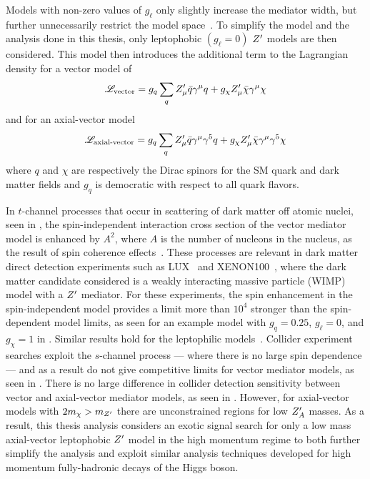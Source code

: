 Models with non-zero values of $g_{\ell}$ only slightly increase the mediator width, but further unnecessarily restrict the model space~\cite{Abercrombie:2015wmb}.
To simplify the model and the analysis done in this thesis, only leptophobic $\left(g_{\ell}=0\right)$ $Z^{\prime}$ models are then considered.
This model then introduces the additional term to the Lagrangian density for a vector model of
\[
 \mathscr{L}_{\textrm{vector}} = g_{q} \sum_{q} Z^{\prime}_{\mu} \bar{q} \gamma^{\mu} q + g_{\chi} Z^{\prime}_{\mu} \bar{\chi} \gamma^{\mu} \chi
\]
and for an axial-vector model
\[
 \mathscr{L}_{\textrm{axial-vector}} = g_{q} \sum_{q} Z^{\prime}_{\mu} \bar{q} \gamma^{\mu}\gamma^{5} q + g_{\chi} Z^{\prime}_{\mu} \bar{\chi} \gamma^{\mu}\gamma^{5} \chi
\]
where $q$ and $\chi$ are respectively the Dirac spinors for the SM quark and dark matter fields and $g_{q}$ is democratic with respect to all quark flavors.

In $t$-channel processes that occur in scattering of dark matter off atomic nuclei, seen in , the spin-independent interaction cross section of the vector mediator model is enhanced by $A^{2}$, where $A$ is the number of nucleons in the nucleus, as the result of spin coherence effects~\cite{Buchmueller:2014yoa,Chala:2015ama,EXOT-2017-32}.
These processes are relevant in dark matter direct detection experiments such as LUX~\cite{Akerib:2013tjd} and XENON100~\cite{Aprile:2013doa}, where the dark matter candidate considered is a weakly interacting massive particle (WIMP) model with a $Z^{\prime}$ mediator.
For these experiments, the spin enhancement in the spin-independent model provides a limit more than $10^{4}$ stronger than the spin-dependent model limits, as seen for an example model with $g_{q} = 0.25$, $g_{\ell} = 0$, and $g_{\chi} = 1$ in .
Similar results hold for the leptophilic models~\cite{EXOT-2017-32}.
Collider experiment searches exploit the $s$-channel process --- where there is no large spin dependence --- and as a result do not give competitive limits for vector mediator models, as seen in .
There is no large difference in collider detection sensitivity between vector and axial-vector mediator models, as seen in .
However, for axial-vector models with $2 m_{\chi} > m_{Z^{\prime}}$ there are unconstrained regions for low $Z^{\prime}_{A}$ masses.
As a result, this thesis analysis considers an exotic signal search for only a low mass axial-vector leptophobic $Z^{\prime}$ model in the high momentum regime to both further simplify the analysis and exploit similar analysis techniques developed for high momentum fully-hadronic decays of the Higgs boson.


